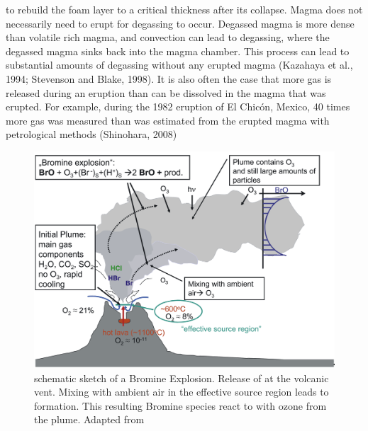 \documentclass  [
  paper    = a4,
  BCOR     = 10mm,
  twoside,
  fontsize = 12pt,
  fleqn,
  toc      = bibnumbered,
  toc      = listofnumbered,
  numbers  = noendperiod,
  headings = normal,
  listof   = leveldown,
  version  = 3.03
]                                       {scrreprt}
\begin{document}
{to rebuild the foam layer to a critical thickness after its collapse.
Magma does not necessarily need to erupt for degassing to occur. Degassed magma is more dense than volatile rich magma, and convection can lead to
degassing, where the degassed magma sinks back into the magma chamber. This
process can lead to substantial amounts of degassing without any erupted magma
(Kazahaya et al., 1994; Stevenson and Blake, 1998). It is also often the case that
more gas is released during an eruption than can be dissolved in the magma
that was erupted. For example, during the 1982 eruption of El Chicón, Mexico,
40 times more gas was measured than was estimated from the erupted magma
with petrological methods (Shinohara, 2008)
		\begin{figure}
		\centering
		\includegraphics[width=0.7\linewidth]{Bilder/Simon/Bilder_Tung/BrO_Plume}
		\caption{schematic sketch of a Bromine Explosion.
			Release of  at the volcanic vent. Mixing with ambient air in the effective source region leads to  formation. This resulting Bromine species react to  with ozone from the plume. Adapted from \cite{bobrowski2007reactive}}
		\label{fig:broplume}
	\end{figure}
}
\end{document}
